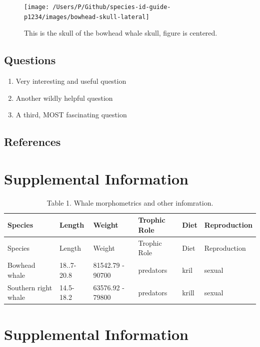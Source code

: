 \documentclass[
]{article}
\providecommand{\tightlist}{%
  \setlength{\itemsep}{0pt}\setlength{\parskip}{0pt}}
\begin{document}
\begin{figure}
\texttt{[image: /Users/P/Github/species-id-guide-p1234/images/bowhead-skull-lateral]} \caption{This is the skull of the bowhead whale skull, figure is centered.}\label{fig:bowhead-whale-skull-lateral}
\end{figure}

\newpage

\hypertarget{questions-1}{%
\subsection{Questions}\label{questions-1}}

\begin{enumerate}
\def\labelenumi{\arabic{enumi}.}
\tightlist
\item
  Very interesting and useful question
\item
  Another wildly helpful question
\item
  A third, MOST fascinating question
\end{enumerate}

\newpage

\hypertarget{references}{%
\subsection{References}\label{references}}

\hypertarget{supplemental-information}{%
\section{Supplemental Information}\label{supplemental-information}}

\begin{longtable}[]{@{}llllll@{}}
\caption{Table 1. Whale morphometrics and other
infomration.}\tabularnewline
\toprule
Species & Length & Weight & Trophic Role & Diet & Reproduction \\
\midrule
\endfirsthead
\toprule
Species & Length & Weight & Trophic Role & Diet & Reproduction \\
\midrule
\endhead
Bowhead whale & 18..7-20.8 & 81542.79 - 90700 & predators & kril &
sexual \\
Southern right whale & 14.5-18.2 & 63576.92 - 79800 & predators & krill
& sexual \\
\bottomrule
\end{longtable}

\hypertarget{supplemental-information-1}{%
\section{Supplemental Information}\label{supplemental-information-1}}
\end{document}
